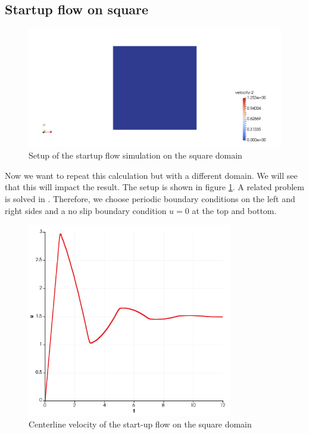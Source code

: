 \documentclass[12pt,a4paper,twoside, open=right]{scrreprt}
\theoremstyle{definition}
\theoremstyle{plain}
\begin{document}
\subsection{Startup flow on square}
\begin{figure}
    \centering
    \includegraphics[width=\textwidth]{SquareSetup}
    \caption{Setup of the startup flow simulation on the square domain}
    \label{fig:squaresetup}
\end{figure}
Now we want to repeat this calculation but with a different domain. We will see that this will impact the result. The setup is shown in figure \ref{fig:squaresetup}. A related problem is solved in \cite{A.S.RDuarte2008}. Therefore, we choose periodic boundary conditions on the left and right sides and a no slip boundary condition $u=0$ at the top and bottom.
\begin{figure}
    \centering
    \includegraphics[width=0.8\textwidth]{SquareCenterline}
    \caption{Centerline velocity of the start-up flow on the square domain}
    \label{fig:squarecenterline}
\end{figure}
\end{document}
